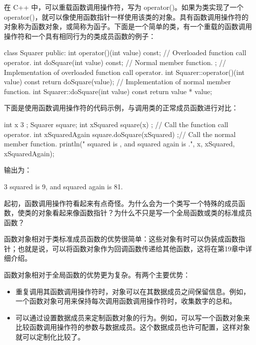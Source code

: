 
在 C++ 中，可以重载函数调用操作符，写为 operator()。如果为类实现了一个 operator()，就可以像使用函数指针一样使用该类的对象。具有函数调用操作符的对象称为函数对象，或简称为函子。下面是一个简单的类，有一个重载的函数调用操作符和一个具有相同行为的类成员函数的例子：

\begin{cpp}
class Squarer
{
    public:
        int operator()(int value) const; // Overloaded function call operator.
        int doSquare(int value) const; // Normal member function.
};
// Implementation of overloaded function call operator.
int Squarer::operator()(int value) const { return doSquare(value); }
// Implementation of normal member function.
int Squarer::doSquare(int value) const { return value * value; }
\end{cpp}

下面是使用函数调用操作符的代码示例，与调用类的正常成员函数进行对比：

\begin{cpp}
int x { 3 };
Squarer square;
int xSquared { square(x) }; // Call the function call operator.
int xSquaredAgain { square.doSquare(xSquared) };// Call the normal member function.
println("{} squared is {}, and squared again is {}.", x, xSquared, xSquaredAgain);
\end{cpp}

输出为：

\begin{shell}
3 squared is 9, and squared again is 81.
\end{shell}

起初，函数调用操作符看起来有点奇怪。为什么会为一个类写一个特殊的成员函数，使类的对象看起来像函数指针？为什么不只是写一个全局函数或类的标准成员函数？

函数对象相对于类标准成员函数的优势很简单：这些对象有时可以伪装成函数指针；也就是说，可以将函数对象作为回调函数传递给其他函数，这将在第19章中详细介绍。

函数对象相对于全局函数的优势更为复杂。有两个主要优势：

\begin{itemize}
\item
重复调用其函数调用操作符时，对象可以在其数据成员之间保留信息。例如，一个函数对象可用来保持每次调用函数调用操作符时，收集数字的总和。

\item
可以通过设置数据成员来定制函数对象的行为。例如，可以写一个函数对象来比较函数调用操作符的参数与数据成员。这个数据成员也许可配置，这样对象就可以定制化比较了。
\end{itemize}

